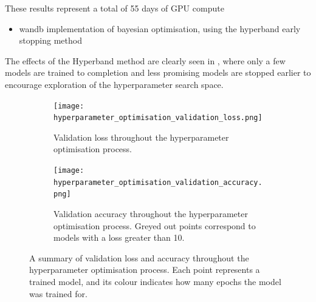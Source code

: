 These results represent a total of 55 days of GPU compute

{\color{red}
  \begin{itemize}
    \item wandb \cite{wandb} implementation of bayesian optimisation, using the hyperband early stopping method
  \end{itemize}
}

The effects of the Hyperband method are clearly seen in \figureautorefname{ \ref{fig:hyperparameter_optimisation_validation_loss_and_accuracy}}, where only a few models are trained to completion and less promising models are stopped earlier to encourage exploration of the hyperparameter search space.

\begin{figure}
    \centering
    \begin{subfigure}[t]{\textwidth}
        \texttt{[image: hyperparameter\_optimisation\_validation\_loss.png]}
        \label{fig:hyperparameter_optimisation_validation_loss}
        \caption{Validation loss throughout the hyperparameter optimisation process.}
    \end{subfigure}
    \par\bigskip %
    \par\bigskip
    \begin{subfigure}[b]{\textwidth}
        \texttt{[image: hyperparameter\_optimisation\_validation\_accuracy.png]}
        \label{fig:hyperparameter_optimisation_validation_accuracy}
        \caption{Validation accuracy throughout the hyperparameter optimisation process. Greyed out points correspond to models with a loss greater than 10.}
    \end{subfigure}
    \caption{A summary of validation loss and accuracy throughout the hyperparameter optimisation process. Each point represents a trained model, and its colour indicates how many epochs the model was trained for.}
    \label{fig:hyperparameter_optimisation_validation_loss_and_accuracy}
\end{figure}




